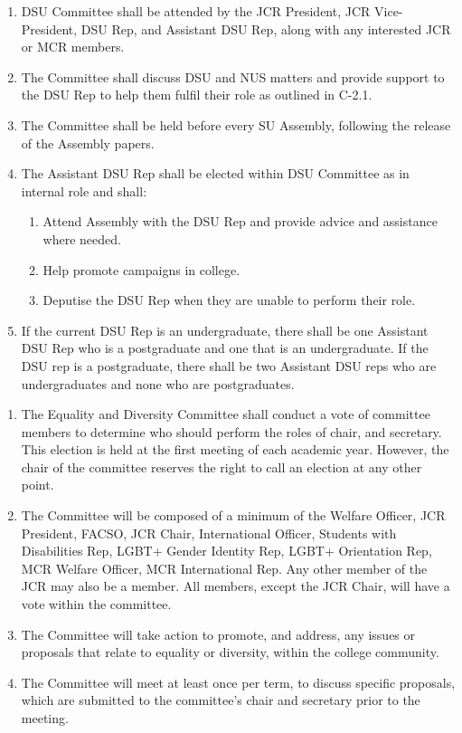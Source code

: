 \begin{enumerate}
    \item DSU Committee shall be attended by the JCR President, JCR Vice-President, DSU Rep, and Assistant DSU Rep, along with any interested JCR or MCR members.
    \item The Committee shall discuss DSU and NUS matters and provide support to the DSU Rep to help them fulfil their role as outlined in C-2.1.
    \item The Committee shall be held before every SU Assembly, following the release of the Assembly papers.
    \item The Assistant DSU Rep shall be elected within DSU Committee as in internal role and shall:
    \begin{enumerate}
        \item Attend Assembly with the DSU Rep and provide advice and assistance where needed. 
        \item Help promote campaigns in college.
        \item Deputise the DSU Rep when they are unable to perform their role.
    \end{enumerate}
    \item If the current DSU Rep is an undergraduate, there shall be one Assistant DSU Rep who is a postgraduate and one that is an undergraduate. If the DSU rep is a postgraduate, there shall be two Assistant DSU reps who are undergraduates and none who are postgraduates.
\end{enumerate}



\begin{enumerate}

    \item The Equality and Diversity Committee shall conduct a vote of committee members to determine who should perform the roles of chair, and secretary. This election is held at the first meeting of each academic year. However, the chair of the committee reserves the right to call an election at any other point.
    \item The Committee will be composed of a minimum of the Welfare Officer, JCR President, FACSO, JCR Chair, International Officer, Students with Disabilities Rep, LGBT+ Gender Identity Rep, LGBT+ Orientation Rep, MCR Welfare Officer, MCR International Rep. Any other member of the JCR may also be a member. All members, except the JCR Chair, will have a vote within the committee.
    \item The Committee will take action to promote, and address, any issues or proposals that relate to equality or diversity, within the college community.
    \item The Committee will meet at least once per term, to discuss specific proposals, which are submitted to the committee’s chair and secretary prior to the meeting.
\end{enumerate}


